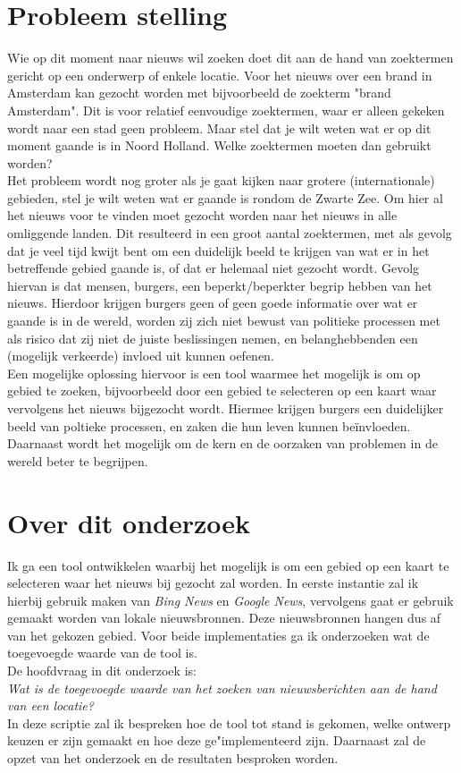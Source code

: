 \documentclass[twoside,openright]{uva-bachelor-thesis}
\begin{document}
	\section{Probleem stelling}
		Wie op dit moment naar nieuws wil zoeken doet dit aan de hand van zoektermen gericht op een onderwerp of enkele locatie. Voor het nieuws over een brand in Amsterdam kan gezocht worden met bijvoorbeeld de zoekterm "brand Amsterdam". Dit is voor relatief eenvoudige zoektermen, waar er alleen gekeken wordt naar een stad geen probleem. Maar stel dat je wilt weten wat er op dit moment gaande is in Noord Holland. Welke zoektermen moeten dan gebruikt worden? 
		\\[0.5cm]
		Het probleem wordt nog groter als je gaat kijken naar grotere (internationale) gebieden, stel je wilt weten wat er gaande is rondom de Zwarte Zee. Om hier al het nieuws voor te vinden moet gezocht worden naar het nieuws in alle omliggende landen. Dit resulteerd in een groot aantal zoektermen, met als gevolg dat je veel tijd kwijt bent om een duidelijk beeld te krijgen van wat er in het betreffende gebied gaande is, of dat er helemaal niet gezocht wordt. Gevolg hiervan is dat mensen, burgers, een beperkt/beperkter begrip hebben van het nieuws. Hierdoor krijgen burgers geen of geen goede informatie over wat er gaande is in de wereld, worden zij zich niet bewust van politieke processen met als risico dat zij niet de juiste beslissingen nemen, en belanghebbenden een (mogelijk verkeerde) invloed uit kunnen oefenen.
		\\[0.5cm]
		Een mogelijke oplossing hiervoor is een tool waarmee het mogelijk is om op gebied te zoeken, bijvoorbeeld door een gebied te selecteren op een kaart waar vervolgens het nieuws bijgezocht wordt. Hiermee krijgen burgers een duidelijker beeld van poltieke processen, en zaken die hun leven kunnen be\"invloeden. Daarnaast wordt het mogelijk om de kern en de oorzaken van problemen in de wereld beter te begrijpen.	
	\section{Over dit onderzoek}
		Ik ga een tool ontwikkelen waarbij het mogelijk is om een gebied op een kaart te selecteren waar het nieuws bij gezocht zal worden. In eerste instantie zal ik hierbij gebruik maken van \textit{Bing News} en \textit{Google News}, vervolgens gaat er gebruik gemaakt worden van lokale nieuwsbronnen. Deze nieuwsbronnen hangen dus af van het gekozen gebied. Voor beide implementaties ga ik onderzoeken wat de toegevoegde waarde van de tool is.
		\\[0.5cm]
		De hoofdvraag in dit onderzoek is:
		\\[0.5cm]
		\indent \textit{Wat is de toegevoegde waarde van het zoeken van nieuwsberichten aan de hand van een locatie?}
		\\[0.5cm]
		In deze scriptie zal ik bespreken hoe de tool tot stand is gekomen, welke ontwerp keuzen er zijn gemaakt en hoe deze ge"implementeerd zijn. Daarnaast zal de opzet van het onderzoek en de resultaten besproken worden.
\end{document}

